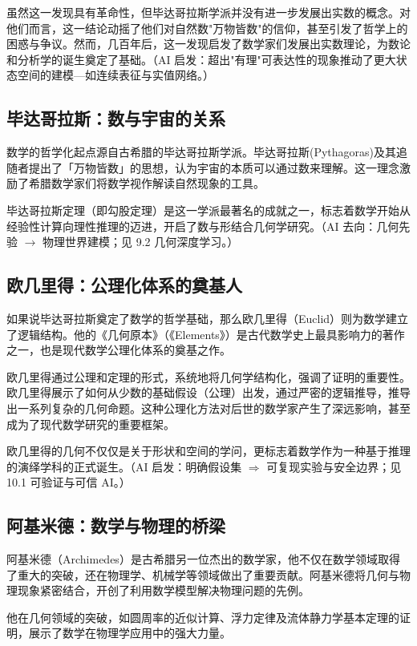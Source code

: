 虽然这一发现具有革命性，但毕达哥拉斯学派并没有进一步发展出实数的概念。对他们而言，这一结论动摇了他们对自然数"万物皆数"的信仰，甚至引发了哲学上的困惑与争议。然而，几百年后，这一发现启发了数学家们发展出实数理论，为数论和分析学的诞生奠定了基础。{（AI 启发：超出"有理"可表达性的现象推动了更大状态空间的建模---如连续表征与实值网络。）}

\subsection{毕达哥拉斯：数与宇宙的关系}

数学的哲学化起点源自古希腊的毕达哥拉斯学派。毕达哥拉斯(Pythagoras){及其}追随者提出了「万物皆数」的思想，认为宇宙的本质可以通过数来理解。这一理念激励了希腊数学家们将数学视作解读自然现象的工具。

毕达哥拉斯定理（即勾股定理）是这一学派最著名的成就之一，标志着数学开始从经验性计算向理性推理的迈进，开启了数与形结合几何学研究。{（AI 去向：几何先验 $\rightarrow$ 物理世界建模；见 9.2 几何深度学习。）}

\subsection{欧几里得：公理化体系的奠基人}

如果说毕达哥拉斯奠定了数学的哲学基础，那么欧几里得（Euclid）则为数学建立了逻辑结构。他的《几何原本》（《Elements》）是古代数学史上最具影响力的著作之一，也是现代数学公理化体系的奠基之作。

欧几里得通过公理和定理的形式，系统地将几何学结构化，强调了证明的重要性。欧几里得展示了如何从少数的基础假设（公理）出发，通过严密的逻辑推导，推导出一系列复杂的几何命题。这种公理化方法对后世的数学家产生了深远影响，甚至成为了现代数学研究的重要框架。

欧几里得的几何不仅仅是关于形状和空间的学问，更标志着数学作为一种基于推理的演绎学科的正式诞生。{（AI 启发：明确假设集 $\Rightarrow$ 可复现实验与安全边界；见 10.1 可验证与可信 AI。）}

\subsection{阿基米德：数学与物理的桥梁}

阿基米德（Archimedes）是古希腊另一位杰出的数学家，他不仅在数学领域取得了重大的突破，还在物理学、机械学等领域做出了重要贡献。阿基米德将几何与物理现象紧密结合，开创了利用数学模型解决物理问题的先例。

他在几何领域的突破，如圆周率的近似计算、浮力定律及流体静力学基本定理的证明，展示了数学在物理学应用中的强大力量。

